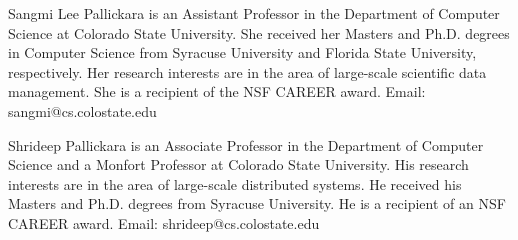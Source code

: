 \documentclass[9pt,journal,compsoc]{IEEEtran}
\begin{document}
%
\vspace{-1.60cm}
\begin{IEEEbiography}{Sangmi Lee Pallickara} is an Assistant Professor in the Department of Computer Science at Colorado State University. She received her Masters and Ph.D. degrees in Computer Science from Syracuse University and Florida State University, respectively. Her research interests are in the area of large-scale scientific data management. She is a recipient of the NSF CAREER award. Email: sangmi@cs.colostate.edu
\end{IEEEbiography}
%
\vspace{-1.56cm}
\begin{IEEEbiography}{Shrideep Pallickara} is an Associate Professor in the Department of Computer Science and a Monfort Professor at Colorado State University. His research interests are in the area of large-scale distributed systems. He received his Masters and Ph.D. degrees from Syracuse University. He is a recipient of an NSF CAREER award. Email: shrideep@cs.colostate.edu
\enlargethispage{0.7cm}
\end{IEEEbiography}
\end{document}
